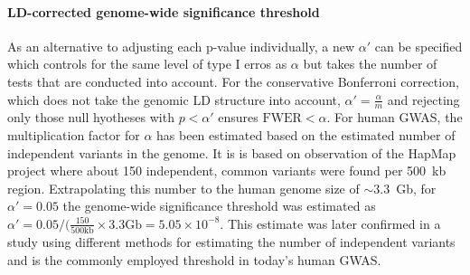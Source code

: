 \paragraph{LD-corrected genome-wide significance threshold}
As an alternative to adjusting each p-value individually, a new \(\alpha '\) can be specified which controls for the same level of type I erros as \(\alpha\) but takes the number of tests that are conducted into account. For the conservative Bonferroni correction, which does not take the genomic LD structure into account, \(\alpha ' = \frac{\alpha}{m}\) and rejecting only those null hyotheses with \(p < \alpha '\) ensures \(\text{FWER} < \alpha\). 
For human GWAS, the multiplication factor for \(\alpha \) has been estimated based on the estimated number of independent variants in the genome.  It is is based on observation of the HapMap project \citeyear{HapMap2005} where about \num{150} independent, common variants were found per \num{500}~kb region.  Extrapolating this number to the human genome size of \(\sim 3.3\)~Gb, for \(\alpha ' =0.05\) the genome-wide significance threshold was estimated as  \(\alpha '= 0.05/(\frac{150}{500\text{kb}} \times 3.3 \text{Gb}= 5.05 \times 10^{-8}\). This estimate was later confirmed in a study using different methods for estimating the number of independent variants \citep{Fadista2016} and is the commonly employed threshold in today's human GWAS.

